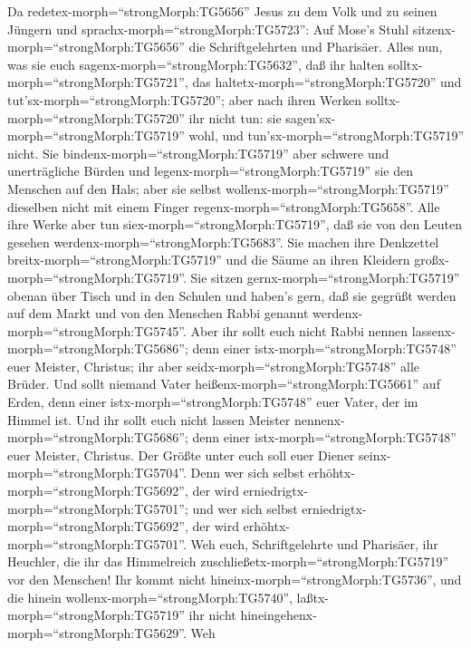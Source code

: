  Da redetex-morph=``strongMorph:TG5656'' Jesus zu dem Volk
und zu seinen Jüngern  und
sprachx-morph=``strongMorph:TG5723'': Auf Mose's Stuhl
sitzenx-morph=``strongMorph:TG5656'' die Schriftgelehrten und Pharisäer.
 Alles nun, was sie euch
sagenx-morph=``strongMorph:TG5632'', daß ihr halten
solltx-morph=``strongMorph:TG5721'', das
haltetx-morph=``strongMorph:TG5720'' und
tut'sx-morph=``strongMorph:TG5720''; aber nach ihren Werken
solltx-morph=``strongMorph:TG5720'' ihr nicht tun: sie
sagen'sx-morph=``strongMorph:TG5719'' wohl, und
tun'sx-morph=``strongMorph:TG5719'' nicht.  Sie
bindenx-morph=``strongMorph:TG5719'' aber schwere und unerträgliche
Bürden und legenx-morph=``strongMorph:TG5719'' sie den Menschen auf den
Hals; aber sie selbst wollenx-morph=``strongMorph:TG5719'' dieselben
nicht mit einem Finger regenx-morph=``strongMorph:TG5658''. 
Alle ihre Werke aber tun siex-morph=``strongMorph:TG5719'', daß sie von
den Leuten gesehen werdenx-morph=``strongMorph:TG5683''. Sie machen ihre
Denkzettel breitx-morph=``strongMorph:TG5719'' und die Säume an ihren
Kleidern großx-morph=``strongMorph:TG5719''.  Sie sitzen
gernx-morph=``strongMorph:TG5719'' obenan über Tisch und in den Schulen
 und haben's gern, daß sie gegrüßt werden auf dem Markt und
von den Menschen Rabbi genannt werdenx-morph=``strongMorph:TG5745''.
 Aber ihr sollt euch nicht Rabbi nennen
lassenx-morph=``strongMorph:TG5686''; denn einer
istx-morph=``strongMorph:TG5748'' euer Meister, Christus; ihr aber
seidx-morph=``strongMorph:TG5748'' alle Brüder.  Und sollt
niemand Vater heißenx-morph=``strongMorph:TG5661'' auf Erden, denn einer
istx-morph=``strongMorph:TG5748'' euer Vater, der im Himmel ist.
 Und ihr sollt euch nicht lassen Meister
nennenx-morph=``strongMorph:TG5686''; denn einer
istx-morph=``strongMorph:TG5748'' euer Meister, Christus. 
Der Größte unter euch soll euer Diener
seinx-morph=``strongMorph:TG5704''.  Denn wer sich selbst
erhöhtx-morph=``strongMorph:TG5692'', der wird
erniedrigtx-morph=``strongMorph:TG5701''; und wer sich selbst
erniedrigtx-morph=``strongMorph:TG5692'', der wird
erhöhtx-morph=``strongMorph:TG5701''.  Weh euch,
Schriftgelehrte und Pharisäer, ihr Heuchler, die ihr das Himmelreich
zuschließetx-morph=``strongMorph:TG5719'' vor den Menschen! Ihr kommt
nicht hineinx-morph=``strongMorph:TG5736'', und die hinein
wollenx-morph=``strongMorph:TG5740'', laßtx-morph=``strongMorph:TG5719''
ihr nicht hineingehenx-morph=``strongMorph:TG5629''.  Weh
